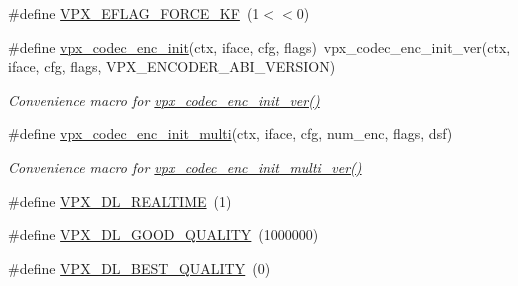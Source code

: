 \begin{DoxyCompactItemize}
\item 
\#define \hyperlink{group__encoder_ga4c4f4e3cbb5225d2c6c050e2d1e948fa}{\-V\-P\-X\-\_\-\-E\-F\-L\-A\-G\-\_\-\-F\-O\-R\-C\-E\-\_\-\-K\-F}~(1$<$$<$0)
\item 
\#define \hyperlink{group__encoder_ga3d490a2a9a6acd7c9ef82a603155f3cf}{vpx\-\_\-codec\-\_\-enc\-\_\-init}(ctx, iface, cfg, flags)~vpx\-\_\-codec\-\_\-enc\-\_\-init\-\_\-ver(ctx, iface, cfg, flags, \-V\-P\-X\-\_\-\-E\-N\-C\-O\-D\-E\-R\-\_\-\-A\-B\-I\-\_\-\-V\-E\-R\-S\-I\-O\-N)
\begin{DoxyCompactList}\small\item\em \-Convenience macro for \hyperlink{group__encoder_ga6ed21b96c481c0b6e1b543ef958a57a4}{vpx\-\_\-codec\-\_\-enc\-\_\-init\-\_\-ver()} \end{DoxyCompactList}\item 
\#define \hyperlink{group__encoder_gad7ae1d930cf110d6fe70beafeacfd9c7}{vpx\-\_\-codec\-\_\-enc\-\_\-init\-\_\-multi}(ctx, iface, cfg, num\-\_\-enc, flags, dsf)
\begin{DoxyCompactList}\small\item\em \-Convenience macro for \hyperlink{group__encoder_ga1c0415984a5469687f53613a5471f53d}{vpx\-\_\-codec\-\_\-enc\-\_\-init\-\_\-multi\-\_\-ver()} \end{DoxyCompactList}\item 
\#define \hyperlink{group__encoder_ga04253cc9ec1146d72fa8bb86bcf32144}{\-V\-P\-X\-\_\-\-D\-L\-\_\-\-R\-E\-A\-L\-T\-I\-M\-E}~(1)
\item 
\#define \hyperlink{group__encoder_ga5d00a9f9e10b9f49ca91e72c1f01c9fd}{\-V\-P\-X\-\_\-\-D\-L\-\_\-\-G\-O\-O\-D\-\_\-\-Q\-U\-A\-L\-I\-T\-Y}~(1000000)
\item 
\#define \hyperlink{group__encoder_gab350573bea112f2fdf8e5677db3ac0da}{\-V\-P\-X\-\_\-\-D\-L\-\_\-\-B\-E\-S\-T\-\_\-\-Q\-U\-A\-L\-I\-T\-Y}~(0)
\end{DoxyCompactItemize}
